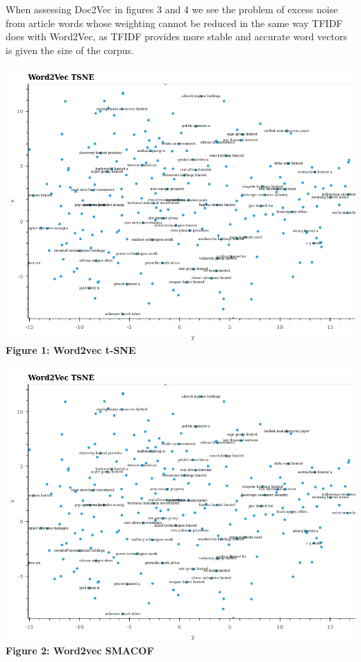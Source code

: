 \documentclass[11pt]{article}
\makeatletter
\def\maxwidth{\ifdim\Gin@nat@width>\linewidth\linewidth
    \else\Gin@nat@width\fi}
\let\Oldincludegraphics\includegraphics
\renewcommand{\includegraphics}[1]{\Oldincludegraphics[width=.8\maxwidth]{#1}}
\makeatother
\begin{document}
When assessing Doc2Vec in figures 3 and 4 we see the problem of excess
noise from article words whose weighting cannot be reduced in the same
way TFIDF does with Word2Vec, as TFIDF provides more stable and accurate
word vectors is given the size of the corpus.

\includegraphics{../experiments/media/Word2Vec TSNE.png}\\

\textbf{Figure 1: Word2vec t-SNE}

\includegraphics{../experiments/media/Word2Vec TSNE.png}\\

\textbf{Figure 2: Word2vec SMACOF}
\end{document}
